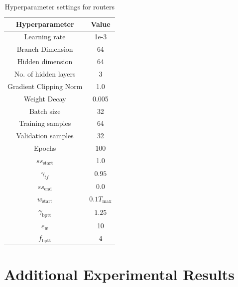 \documentclass{article} %
\begin{document}
\begin{table}
    \centering
    \begin{tabular}{|c|c|}
        \hline
        Hyperparameter & Value\\
        \hline \hline
        Learning rate & 1e-3 \\
        Branch Dimension & 64 \\
        Hidden dimension & 64 \\
        No. of hidden layers & 3\\
        Gradient Clipping Norm & 1.0  \\
        Weight Decay & 0.005 \\
        Batch size & 32 \\
        Training samples & 64 \\
        Validation samples & 32 \\
        Epochs & 100 \\
        $ss_{\text{start}}$ & 1.0\\
        $\gamma_{tf}$ & $0.95$ \\
        $ss_{\text{end}}$ & 0.0 \\
        $w_{\text{start}}$ & $0.1T_{\max}$ \\
        $\gamma_{\text{bptt}}$ & $1.25$ \\
        $e_w$ & 10 \\
        $f_{\text{bptt}}$ & $4$ \\
        \hline
    \end{tabular}
    \caption{Hyperparameter settings for routers}
    \label{tab:routerhpsettings}
\end{table}




\section{Additional Experimental Results} \label{sec:moreexperimentalresults}
\end{document}
